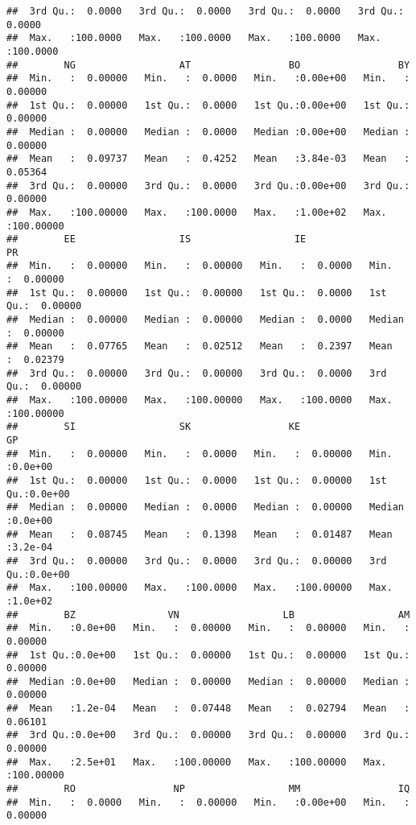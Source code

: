\documentclass[
]{article}
\begin{document}
\begin{verbatim}
##  3rd Qu.:  0.0000   3rd Qu.:  0.0000   3rd Qu.:  0.0000   3rd Qu.:  0.0000  
##  Max.   :100.0000   Max.   :100.0000   Max.   :100.0000   Max.   :100.0000  
##        NG                  AT                 BO                 BY           
##  Min.   :  0.00000   Min.   :  0.0000   Min.   :0.00e+00   Min.   :  0.00000  
##  1st Qu.:  0.00000   1st Qu.:  0.0000   1st Qu.:0.00e+00   1st Qu.:  0.00000  
##  Median :  0.00000   Median :  0.0000   Median :0.00e+00   Median :  0.00000  
##  Mean   :  0.09737   Mean   :  0.4252   Mean   :3.84e-03   Mean   :  0.05364  
##  3rd Qu.:  0.00000   3rd Qu.:  0.0000   3rd Qu.:0.00e+00   3rd Qu.:  0.00000  
##  Max.   :100.00000   Max.   :100.0000   Max.   :1.00e+02   Max.   :100.00000  
##        EE                  IS                  IE                 PR           
##  Min.   :  0.00000   Min.   :  0.00000   Min.   :  0.0000   Min.   :  0.00000  
##  1st Qu.:  0.00000   1st Qu.:  0.00000   1st Qu.:  0.0000   1st Qu.:  0.00000  
##  Median :  0.00000   Median :  0.00000   Median :  0.0000   Median :  0.00000  
##  Mean   :  0.07765   Mean   :  0.02512   Mean   :  0.2397   Mean   :  0.02379  
##  3rd Qu.:  0.00000   3rd Qu.:  0.00000   3rd Qu.:  0.0000   3rd Qu.:  0.00000  
##  Max.   :100.00000   Max.   :100.00000   Max.   :100.0000   Max.   :100.00000  
##        SI                  SK                 KE                  GP         
##  Min.   :  0.00000   Min.   :  0.0000   Min.   :  0.00000   Min.   :0.0e+00  
##  1st Qu.:  0.00000   1st Qu.:  0.0000   1st Qu.:  0.00000   1st Qu.:0.0e+00  
##  Median :  0.00000   Median :  0.0000   Median :  0.00000   Median :0.0e+00  
##  Mean   :  0.08745   Mean   :  0.1398   Mean   :  0.01487   Mean   :3.2e-04  
##  3rd Qu.:  0.00000   3rd Qu.:  0.0000   3rd Qu.:  0.00000   3rd Qu.:0.0e+00  
##  Max.   :100.00000   Max.   :100.0000   Max.   :100.00000   Max.   :1.0e+02  
##        BZ                VN                  LB                  AM           
##  Min.   :0.0e+00   Min.   :  0.00000   Min.   :  0.00000   Min.   :  0.00000  
##  1st Qu.:0.0e+00   1st Qu.:  0.00000   1st Qu.:  0.00000   1st Qu.:  0.00000  
##  Median :0.0e+00   Median :  0.00000   Median :  0.00000   Median :  0.00000  
##  Mean   :1.2e-04   Mean   :  0.07448   Mean   :  0.02794   Mean   :  0.06101  
##  3rd Qu.:0.0e+00   3rd Qu.:  0.00000   3rd Qu.:  0.00000   3rd Qu.:  0.00000  
##  Max.   :2.5e+01   Max.   :100.00000   Max.   :100.00000   Max.   :100.00000  
##        RO                 NP                  MM                 IQ           
##  Min.   :  0.0000   Min.   :  0.00000   Min.   :0.00e+00   Min.   :  0.00000  

\end{verbatim}
\end{document}
